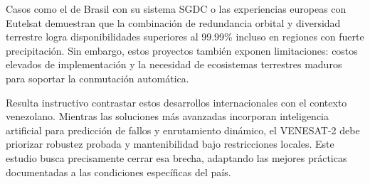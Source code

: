 Casos como el de Brasil con su sistema SGDC o las experiencias europeas con Eutelsat demuestran que la combinación de redundancia orbital y diversidad terrestre logra disponibilidades superiores al 99.99\% incluso en regiones con fuerte precipitación. Sin embargo, estos proyectos también exponen limitaciones: costos elevados de implementación y la necesidad de ecosistemas terrestres maduros para soportar la conmutación automática.

Resulta instructivo contrastar estos desarrollos internacionales con el contexto venezolano. Mientras las soluciones más avanzadas incorporan inteligencia artificial para predicción de fallos y enrutamiento dinámico, el VENESAT-2 debe priorizar robustez probada y mantenibilidad bajo restricciones locales. Este estudio busca precisamente cerrar esa brecha, adaptando las mejores prácticas documentadas a las condiciones específicas del país.